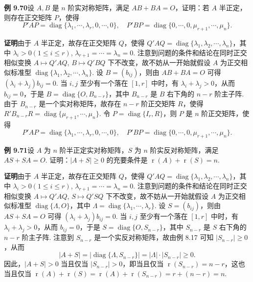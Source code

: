 \documentclass[UTF8,12pt,a4paper,fontset=fandol]{ctexart}
\begin{document}
\noindent\textbf{例 9.70}\quad 设 $A,B$ 是 $n$ 阶实对称矩阵，满足 $AB+BA=O$，证明：若 $A$ 半正定，则存在正交矩阵 $P$，使得
\[
P'AP=\operatorname{diag}\{\lambda_1,\cdots,\lambda_r,0,\cdots,0\},\quad
P'BP=\operatorname{diag}\{0,\cdots,0,\mu_{r+1},\cdots,\mu_n\}.
\]

\noindent\textbf{证明}\quad 由于 $A$ 半正定，故存在正交矩阵 $Q$，使得 $Q'AQ=\operatorname{diag}\{\lambda_1,\lambda_2,\cdots,\lambda_n\}$，其中 $\lambda_i>0(1\le i\le r)$, $\lambda_{r+1}=\cdots=\lambda_n=0$. 注意到问题的条件和结论在同时正交相似变换 $A\mapsto Q'AQ$, $B\mapsto Q'BQ$ 下不改变，故不妨从一开始就假设 $A$ 为正交相似标准型 $\operatorname{diag}\{\lambda_1,\lambda_2,\cdots,\lambda_n\}$. 设 $B=(b_{ij})$，则由 $AB+BA=O$ 可得 $(\lambda_i+\lambda_j)b_{ij}=0$. 当 $i,j$ 至少有一个落在 $[1,r]$ 中时，有 $\lambda_i+\lambda_j>0$，从而 $b_{ij}=0$，于是 $B=\operatorname{diag}\{O,B_{n-r}\}$，其中 $B_{n-r}$ 是 $B$ 右下角的 $n-r$ 阶主子阵. 由于 $B_{n-r}$ 是一个实对称矩阵，故存在 $n-r$ 阶正交矩阵 $R$，使得 $R'B_{n-r}R=\operatorname{diag}\{\mu_{r+1},\cdots,\mu_n\}$. 令 $P=\operatorname{diag}\{I_r,R\}$，则 $P$ 是 $n$ 阶正交矩阵，使得
\[
P'AP=\operatorname{diag}\{\lambda_1,\cdots,\lambda_r,0,\cdots,0\},\quad
P'BP=\operatorname{diag}\{0,\cdots,0,\mu_{r+1},\cdots,\mu_n\}.
\]

\noindent\textbf{例 9.71}\quad 设 $A$ 为 $n$ 阶半正定实对称矩阵，$S$ 为 $n$ 阶实反对称矩阵，满足 $AS+SA=O$. 证明：$|A+S|\ge0$ 的充要条件是 $\operatorname{r}(A)+\operatorname{r}(S)=n$.

\noindent\textbf{证明}\quad 由于 $A$ 半正定，故存在正交矩阵 $Q$，使得 $Q'AQ=\operatorname{diag}\{\lambda_1,\lambda_2,\cdots,\lambda_n\}$，其中 $\lambda_i>0(1\le i\le r)$, $\lambda_{r+1}=\cdots=\lambda_n=0$. 注意到问题的条件和结论在同时正交相似变换 $A\mapsto Q'AQ$, $S\mapsto Q'SQ$ 下不改变，故不妨从一开始就假设 $A$ 为正交相似标准型 $\operatorname{diag}\{\Lambda,O\}$，其中 $\Lambda=\operatorname{diag}\{\lambda_1,\cdots,\lambda_r\}$. 设 $S=(b_{ij})$，则由 $AS+SA=O$ 可得 $(\lambda_i+\lambda_j)b_{ij}=0$. 当 $i,j$ 至少有一个落在 $[1,r]$ 中时，有 $\lambda_i+\lambda_j>0$，从而 $b_{ij}=0$，于是 $S=\operatorname{diag}\{O,S_{n-r}\}$，其中 $S_{n-r}$ 是 $S$ 右下角的 $n-r$ 阶主子阵. 注意到 $S_{n-r}$ 是一个实反对称矩阵，故由例 8.17 可知 $|S_{n-r}|\ge0$，从而
\[
|A+S|=|\operatorname{diag}\{\Lambda,S_{n-r}\}|=|\Lambda|\cdot |S_{n-r}|\ge0.
\]
因此，$|A+S|>0$ 当且仅当 $|S_{n-r}|>0$，即当且仅当 $\operatorname{r}(S_{n-r})=n-r$，这也当且仅当 $\operatorname{r}(A)+\operatorname{r}(S)=\operatorname{r}(A)+\operatorname{r}(S_{n-r})=r+(n-r)=n$.
\end{document}
